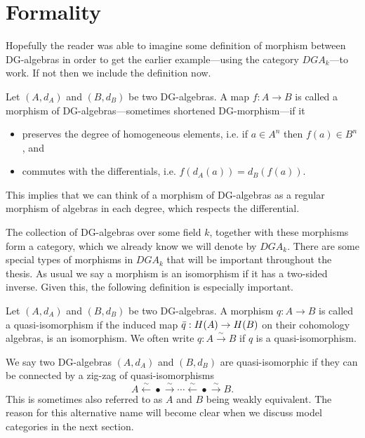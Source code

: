 \section{Formality}
\label{sec:formality}

Hopefully the reader was able to imagine some definition of morphism between DG-algebras in order to get the earlier example---using the category $DGA_k$---to work. If not then we include the definition now. 

\begin{definition}[DG morphism]
\label{def:dg-morphism}
Let $(A, d_A)$ and $(B, d_B)$ be two DG-algebras. A map $f:A\longrightarrow B$ is called a morphism of DG-algebras---sometimes shortened DG-morphism---if it
\begin{itemize}
    \item preserves the degree of homogeneous elements, i.e. if $a\in A^n$ then $f(a)\in B^n$, and
    \item commutes with the differentials, i.e. $f(d_A(a))=d_B(f(a))$. 
\end{itemize}
\end{definition}

This implies that we can think of a morphism of DG-algebras as a regular morphism of algebras in each degree, which respects the differential.

The collection of DG-algebras over some field $k$, together with these morphisms form a category, which we already know we will denote by $DGA_k$. There are some special types of morphisms in $DGA_k$ that will be important throughout the thesis. As usual we say a morphism is an isomorphism if it has a two-sided inverse. Given this, the following definition is especially important. 

\begin{definition}
\label{def:quasi-isomorphism}
Let $(A, d_A)$ and $(B, d_B)$ be two DG-algebras. A morphism $q:A\longrightarrow B$ is called a quasi-isomorphism if the induced map $\Bar{q}:H(A)\rightarrow H(B)$ on their cohomology algebras, is an isomorphism. We often write $q:A\overset{\sim}\longrightarrow B$ if $q$ is a quasi-isomorphism. 
\end{definition}

\begin{definition}
\label{def:quasi-isomorphic}
We say two DG-algebras $(A, d_A)$ and $(B, d_B)$ are quasi-isomorphic if they can be connected by a zig-zag of quasi-isomorphisms 
\begin{equation*}
    A \overset{\sim}\longleftarrow \bullet \overset{\sim}\longrightarrow \cdots \overset{\sim}\longleftarrow \bullet \overset{\sim}\longrightarrow B .
\end{equation*}
This is sometimes also referred to as $A$ and $B$ being weakly equivalent. The reason for this alternative name will become clear when we discuss model categories in the next section. 
\end{definition}

